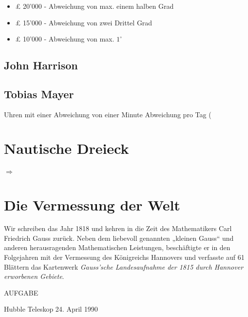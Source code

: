 \begin{refsection}
\begin{itemize}
\item £ 20’000 - Abweichung von max. einem halben Grad
\item £ 15’000 - Abweichung von zwei Drittel Grad
\item £ 10’000 - Abweichung von max. $1 ^{\circ}$
\end{itemize}

\subsection{John Harrison}


\subsection{Tobias Mayer}



Uhren mit einer Abweichung von einer Minute Abweichung pro Tag (





\section{Nautische Dreieck}


$\Rightarrow$





\section{Die Vermessung der Welt}
Wir schreiben das Jahr 1818 und kehren in die Zeit des Mathematikers Carl Friedrich Gauss zurück. Neben dem liebevoll genannten „kleinen Gauss“ und anderen herausragenden Mathematischen Leistungen, beschäftigte er in den Folgejahren mit der Vermessung des Königreichs Hannovers und verfasste auf 61 Blättern das Kartenwerk \textit{Gauss’sche Landesaufnahme der 1815 durch Hannover erworbenen Gebiete}.






AUFGABE

Hubble Teleskop 
24. April 1990






\printbibliography[heading=subbibliography]
\end{refsection}



